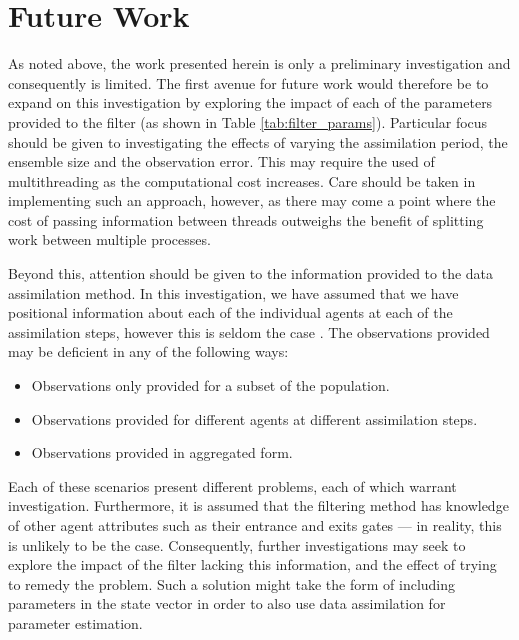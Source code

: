 \section{Future Work}\label{sec:conc:future}

As noted above, the work presented herein is only a preliminary investigation
and consequently is limited.
The first avenue for future work would therefore be to expand on this
investigation by exploring the impact of each of the parameters provided to the
filter (as shown in Table \ref{tab:filter_params}).
Particular focus should be given to investigating the effects of varying the
assimilation period, the ensemble size and the observation error.
This may require the used of multithreading as the computational cost increases.
Care should be taken in implementing such an approach, however, as there may
come a point where the cost of passing information between threads outweighs the
benefit of splitting work between multiple processes.

Beyond this, attention should be given to the information provided to the data
assimilation method.
In this investigation, we have assumed that we have positional information about
each of the individual agents at each of the assimilation steps, however this is
seldom the case \citep{council2019leeds}.
The observations provided may be deficient in any of the following ways:
\begin{itemize}
    \item Observations only provided for a subset of the population.
    \item Observations provided for different agents at different assimilation
        steps.
    \item Observations provided in aggregated form. 
\end{itemize}
Each of these scenarios present different problems, each of which warrant
investigation.
Furthermore, it is assumed that the filtering method has knowledge of other
agent attributes such as their entrance and exits gates --- in reality, this is
unlikely to be the case.
Consequently, further investigations may seek to explore the impact of the
filter lacking this information, and the effect of trying to remedy the problem.
Such a solution might take the form of including parameters in the state vector
in order to also use data assimilation for parameter estimation.

